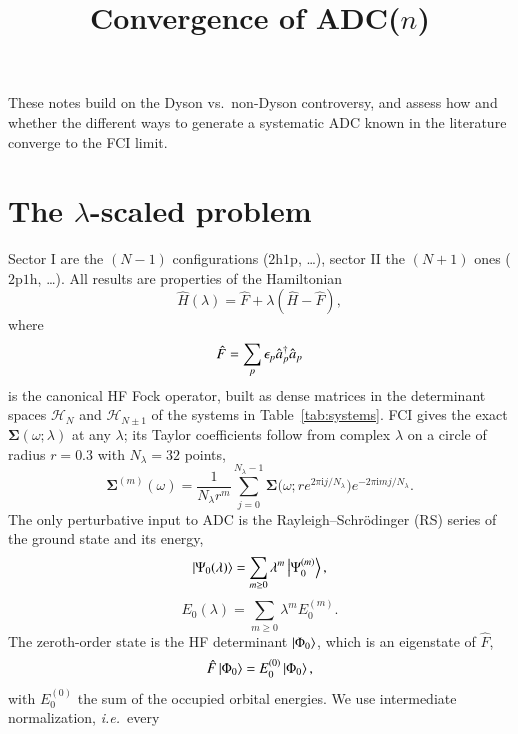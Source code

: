 \documentclass[aip,jcp,reprint,noshowkeys,superscriptaddress]{revtex4-1}
\newcommand{\ie}{\textit{i.e.}}
\newcommand{\cre}[1]{\Hat{a}_{#1}^{\dag}}
\newcommand{\ani}[1]{\Hat{a}_{#1}}
\newcommand{\eps}{\epsilon}
\newcommand{\la}{\lambda}
\newcommand{\ii}{\mathrm{i}}
\newcommand{\hhp}{\text{2h1p}}
\newcommand{\pph}{\text{2p1h}}
\begin{document}
\title{Convergence of ADC($n$)}

\maketitle

These notes build on the Dyson vs.\ non-Dyson
controversy, and assess how and whether the different ways to generate a systematic ADC
known in the literature converge to the FCI limit. 

\section{The \texorpdfstring{$\la$}{lambda}-scaled problem}

Sector I are the $(N-1)$ configurations ($\hhp$, \ldots), sector II the $(N+1)$
ones ($\pph$, \ldots). All results are properties of the Hamiltonian
\begin{equation}
\hat H(\la) = \hat F + \la(\hat H - \hat F) ,
\end{equation}
where
\begin{equation}
\hat F=\sum_p\eps_p\cre{p}\ani{p}
\end{equation}
is the canonical HF Fock operator, built as dense matrices in the
determinant spaces $\mathcal H_N$ and $\mathcal H_{N\pm1}$ of the systems in Table~\ref{tab:systems}. FCI gives the exact $\bm\Sigma(\omega;\la)$ at
any $\la$; its Taylor coefficients follow from complex $\la$ on a circle of radius $r=0.3$ with
$N_\la=32$ points,\cite{Lyness_1967}
\begin{equation}
\bm\Sigma^{(m)}(\omega) = \frac{1}{N_\la r^m}\sum_{j=0}^{N_\la-1}
\bm\Sigma\big(\omega;re^{2\pi\ii j/N_\la}\big)e^{-2\pi\ii mj/N_\la} .
\end{equation}
The only perturbative input to ADC is the Rayleigh--Schr\"odinger (RS) series of the ground state and its
energy,
\begin{equation}
\ket{\Psi_0(\la)} = \sum_{m\ge0}\la^m\ket{\Psi_0^{(m)}} ,
\end{equation}
\begin{equation}
E_0(\la) = \sum_{m\ge0}\la^m E_0^{(m)} .
\end{equation}
The zeroth-order state is the HF determinant $\ket{\Phi_0}$, which is an eigenstate of $\hat F$,
\begin{equation}
\hat F\ket{\Phi_0} = E_0^{(0)}\ket{\Phi_0} ,
\end{equation}
with $E_0^{(0)}$ the sum of the occupied orbital energies. We use intermediate normalization, \ie\ every
\end{document}
